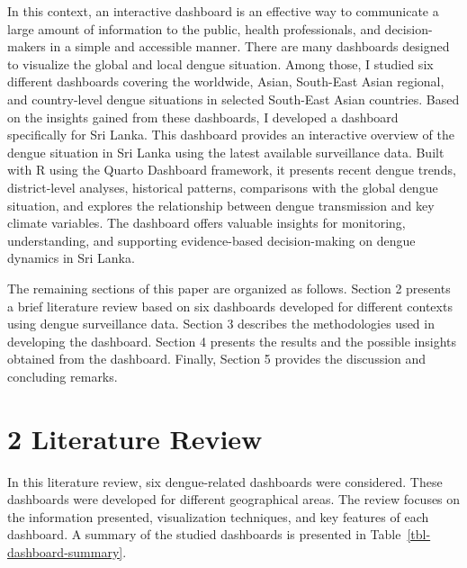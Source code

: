 \documentclass[
]{article}
\begin{document}
In this context, an interactive dashboard is an effective way to
communicate a large amount of information to the public, health
professionals, and decision-makers in a simple and accessible manner.
There are many dashboards designed to visualize the global and local
dengue situation. Among those, I studied six different dashboards
covering the worldwide, Asian, South-East Asian regional, and
country-level dengue situations in selected South-East Asian countries.
Based on the insights gained from these dashboards, I developed a
dashboard specifically for Sri Lanka. This dashboard provides an
interactive overview of the dengue situation in Sri Lanka using the
latest available surveillance data. Built with R using the Quarto
Dashboard framework, it presents recent dengue trends, district-level
analyses, historical patterns, comparisons with the global dengue
situation, and explores the relationship between dengue transmission and
key climate variables. The dashboard offers valuable insights for
monitoring, understanding, and supporting evidence-based decision-making
on dengue dynamics in Sri Lanka.

The remaining sections of this paper are organized as follows. Section 2
presents a brief literature review based on six dashboards developed for
different contexts using dengue surveillance data. Section 3 describes
the methodologies used in developing the dashboard. Section 4 presents
the results and the possible insights obtained from the dashboard.
Finally, Section 5 provides the discussion and concluding remarks.

\section{2 Literature Review}\label{literature-review}

In this literature review, six dengue-related dashboards were
considered. These dashboards were developed for different geographical
areas. The review focuses on the information presented, visualization
techniques, and key features of each dashboard. A summary of the studied
dashboards is presented in Table~\ref{tbl-dashboard-summary}.
\end{document}
